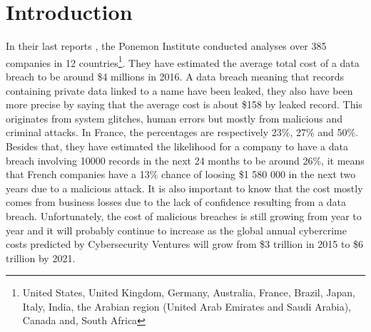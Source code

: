 \documentclass{eplmastersthesis}
\begin{document}
\chapter{Introduction}

In their last reports \cite{ponemon2016cost, ponemon2016costFr}, the Ponemon Institute conducted analyses over 385 companies in 12 countries\footnote{United States, United Kingdom, Germany, Australia, France, Brazil, Japan, Italy, India, the Arabian region (United Arab Emirates and Saudi Arabia), Canada and, South Africa}. They have estimated the average total cost of a data breach to be around \$4 millions in 2016. A data breach meaning that records containing private data linked to a name have been leaked, they also have been more precise by saying that the average cost is about \$158 by leaked record. This originates from system glitches, human errors but mostly from malicious and criminal attacks. In France, the percentages are respectively 23\%, 27\% and 50\%. Besides that, they have estimated the likelihood for a company to have a data breach involving 10000 records in the next 24 months to be around 26\%, it means that French companies have a 13\% chance of loosing \$1 580 000 in the next two years due to a malicious attack. It is also important to know that the cost mostly comes from business  losses due to the lack of confidence resulting from a data breach. Unfortunately, the cost of malicious breaches is still growing from year to year and it will probably continue to increase as the global annual cybercrime costs predicted by Cybersecurity Ventures will grow from  \$3 trillion in 2015 to \$6 trillion by 2021.\\
\end{document}
